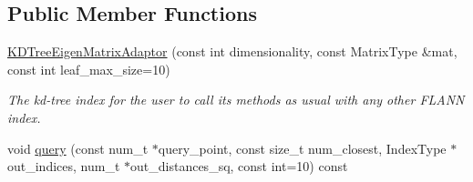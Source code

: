 \subsection*{Public Member Functions}
\begin{DoxyCompactItemize}
\item 
\hyperlink{structSph_1_1KDTreeEigenMatrixAdaptor_a9968b3bdc08f148f419432a8339f1167}{K\+D\+Tree\+Eigen\+Matrix\+Adaptor} (const int dimensionality, const Matrix\+Type \&mat, const int leaf\+\_\+max\+\_\+size=10)
\begin{DoxyCompactList}\small\item\em The kd-\/tree index for the user to call its methods as usual with any other F\+L\+A\+NN index. \end{DoxyCompactList}\item 
void \hyperlink{structSph_1_1KDTreeEigenMatrixAdaptor_ae1335fbcb8f1189326409a1d582c6cb5}{query} (const num\+\_\+t $\ast$query\+\_\+point, const size\+\_\+t num\+\_\+closest, Index\+Type $\ast$out\+\_\+indices, num\+\_\+t $\ast$out\+\_\+distances\+\_\+sq, const int=10) const
\end{DoxyCompactItemize}
